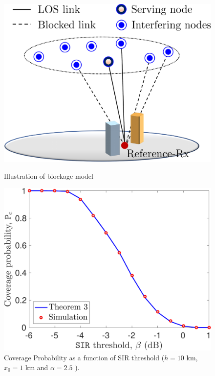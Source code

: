 \documentclass[journal,draftclsnofoot,onecolumn,12pt]{IEEEtran}
\begin{document}
\begin{figure}
\begin{minipage}{.48\textwidth}
\includegraphics[width=1\textwidth]{./sysmod4}
\caption{Illustration of blockage model}
\label{fig:sysmod4}
\end{minipage}%
\hfill
\begin{minipage}{.48\textwidth}
\includegraphics[width=1\textwidth]{./impactb}
\caption{Coverage Probability as a function of SIR threshold ($h=10$ km, $x_0 = 1$ km and $\alpha = 2.5$ ).}
\label{fig:impactb}
\end{minipage}
\end{figure}
\end{document}
